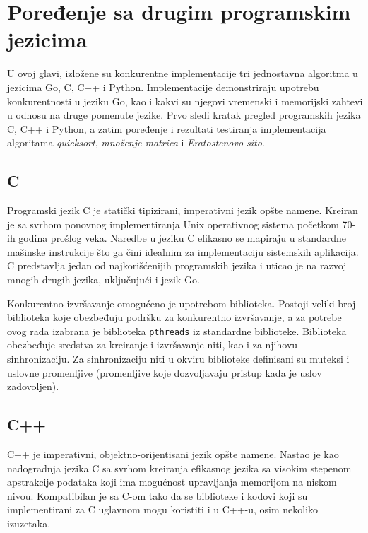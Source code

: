 \documentclass[12pt,oneside]{memoir}
\begin{document}

\chapter {Poređenje sa drugim programskim jezicima} \label{g4}
U ovoj glavi, izložene su konkurentne implementacije tri jednostavna algoritma u jezicima Go, C, C++ i Python.  Implementacije demonstriraju upotrebu konkurentnosti u jeziku Go, kao i kakvi su njegovi vremenski i memorijski zahtevi u odnosu na druge pomenute jezike. Prvo sledi kratak pregled programskih jezika C, C++ i Python, a zatim poređenje i rezultati testiranja implementacija algoritama \textit{quicksort}, \textit{množenje matrica} i \textit{Eratostenovo sito}.

\section{C}

Programski jezik C je statički tipizirani, imperativni jezik opšte namene. Kreiran je sa svrhom ponovnog implementiranja Unix operativnog sistema početkom 70-ih godina prošlog veka. Naredbe u jeziku C efikasno se mapiraju u standardne mašinske instrukcije što ga čini idealnim za implementaciju sistemskih aplikacija. C predstavlja jedan od najkorišćenijih programskih jezika i uticao je na razvoj mnogih drugih jezika, uključujući i jezik Go. 

Konkurentno izvršavanje omogućeno je upotrebom biblioteka. Postoji veliki broj biblioteka koje obezbeđuju podršku za konkurentno izvršavanje, a za potrebe ovog rada izabrana je biblioteka \texttt{pthreads} \cite{pthr} iz standardne biblioteke. Biblioteka obezbeđuje sredstva za kreiranje i izvršavanje niti, kao i za njihovu sinhronizaciju. Za sinhronizaciju niti u okviru biblioteke definisani su muteksi i uslovne promenljive (promenljive koje dozvoljavaju pristup kada je uslov zadovoljen). 

\section{C++}

C++ je imperativni, objektno-orijentisani jezik opšte namene. Nastao je kao nadogradnja jezika C sa svrhom kreiranja efikasnog jezika sa visokim stepenom apstrakcije podataka koji ima mogućnost upravljanja memorijom na niskom nivou. Kompatibilan je sa C-om tako da se biblioteke i kodovi koji su implementirani za C uglavnom mogu koristiti i u C++-u, osim nekoliko izuzetaka.
\end{document}
